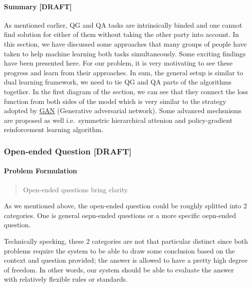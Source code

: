 \documentclass[]{book}
\let\oldparagraph\paragraph
\renewcommand{\paragraph}[1]{\oldparagraph{#1}\mbox{}}
\theoremstyle{definition}
\theoremstyle{definition}
\theoremstyle{definition}
\theoremstyle{remark}
\begin{document}
\paragraph{Summary {[}DRAFT{]}}\label{summary-draft}

As mentioned earlier, QG and QA tasks are intrinsically binded and one
cannot find solution for either of them without taking the other party
into account. In this section, we have discussed some approaches that
many groups of people have taken to help machine learning both tasks
simultaneously. Some exciting findings have been presented here. For our
problem, it is very motivating to see these progress and learn from
their approaches. In sum, the general setup is similar to dual learning
framework, we need to tie QG and QA parts of the algorithms together. In
the first diagram of the section, we can see that they connect the loss
function from both sides of the model which is very similar to the
strategy adopted by
\href{https://en.wikipedia.org/wiki/Generative_adversarial_network}{GAN}
(Generative adversarial network). Some advanced mechsnisms are proposed
as well i.e.~symmetric hierarchical attenion and policy-gradient
reinforcement learning algorithm.

\subsubsection{Open-ended Question
{[}DRAFT{]}}\label{open-ended-question-draft}

\paragraph{Problem Formulation}\label{problem-formulation-1}

\begin{quote}
Open-ended questions bring clarity.
\end{quote}

As we mentioned above, the open-ended question could be roughly splitted
into 2 categories. One is general oepn-ended questions or a more
specific oepn-ended question.

Technically specking, these 2 categories are not that particular
distinct since both problems require the system to be able to draw some
conclusion based on the context and question provided; the answer is
allowed to have a pretty high degree of freedom. In other words, our
system should be able to evaluate the answer with relatively flexible
rules or standards.
\end{document}
